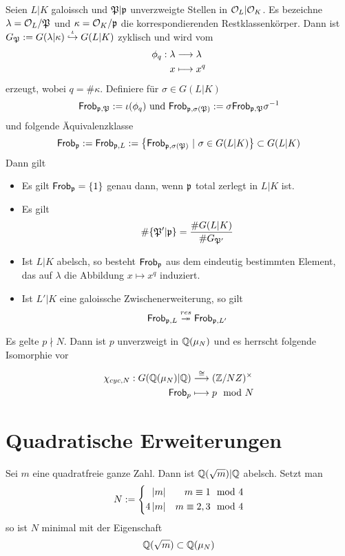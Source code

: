 \Prop{}
Seien $L|K$ galoissch und $\mathfrak{P}|\mathfrak{p}$ unverzweigte Stellen in $\mathcal{O}_L|\mathcal{O}_K$. Es bezeichne $\lambda = \mathcal{O}_L / \mathfrak{P}$ und $\kappa = \mathcal{O}_K /\mathfrak{p}$ die korrespondierenden Restklassenkörper. Dann ist $G_{\mathfrak{P}} := G(\lambda | \kappa) \overset{\iota}{\hookrightarrow} G(L|K)$ zyklisch und wird vom 
\begin{align*}
\phi_q : \lambda & \overset{}{\longrightarrow} \lambda\\
x &\longmapsto x^q 
\end{align*}
erzeugt, wobei $q = \# \kappa$. Definiere für $\sigma \in G(L|K)$
\[ \textsf{Frob}_{\mathfrak{p}, \mathfrak{P}} := \iota(\phi_q) \text{ und } \textsf{Frob}_{\mathfrak{p}, \sigma(\mathfrak{P})} := \sigma \textsf{Frob}_{\mathfrak{p}, \mathfrak{P}} \sigma^{-1} \]
und folgende Äquivalenzklasse
\[ \Frob_\pf :=\Frob_{\pf,L} := \set{ \Frob_{\pf, \sigma(\Pf)} }{\sigma \in G(L|K)} \subset G(L|K) \]
Dann gilt
\begin{itemize}
	\item Es gilt $\textsf{Frob}_{\mathfrak{p}} = \{1\}$ genau dann, wenn $\mathfrak{p}$ total zerlegt in $L|K$ ist.
	\item Es gilt
	\[ \#\{ \mathfrak{P}' | \mathfrak{p} \} = \frac{\#G(L|K)}{\#G_{\mathfrak{P}'}} \]
	\item Ist $L|K$ abelsch, so besteht $\textsf{Frob}_{\mathfrak{p}}$ aus dem eindeutig bestimmten Element, das auf $\lambda$ die Abbildung $x \mapsto x^q$ induziert.
	\item Ist $L'|K$ eine galoissche Zwischenerweiterung, so gilt
	\[ \textsf{Frob}_{\mathfrak{p}, L} \overset{res}{\twoheadrightarrow} \textsf{Frob}_{\mathfrak{p},L'} \]
\end{itemize}

\Prop{}
Es gelte $p\nmid N$. Dann ist $p$ unverzweigt in $\mathbb{Q}(\mu_N)$ und es herrscht folgende Isomorphie vor
\begin{align*}
\chi_{cyc, N} : G(\mathbb{Q}(\mu_N) | \mathbb{Q}) & \overset{\overset{}{\cong}}{\longrightarrow} (\mathbb{Z}/NZ)^\times\\
\textsf{Frob}_p & \longmapsto p \mod{N}
\end{align*}

\section{Quadratische Erweiterungen}
\Prop{}
Sei $m$ eine quadratfreie ganze Zahl. Dann ist $\mathbb{Q}(\sqrt{m}) | \mathbb{Q}$ abelsch. Setzt man
\begin{align*}
N := 
\left\lbrace\begin{aligned}
\left|m\right| && m \equiv 1 \mod{4}\\
4\left|m\right| && m \equiv 2,3 \mod{4}
\end{aligned}\right.
\end{align*}
so ist $N$ minimal mit der Eigenschaft
\[ \mathbb{Q}(\sqrt{m}) \subset \mathbb{Q}(\mu_N) \]

